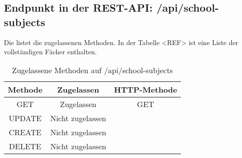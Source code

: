 \subsection{Endpunkt in der REST-API: /api/school-subjects}
\label{sec:end:rest:api:school-subjects}
Die  listet die zugelassenen Methoden. 
In der Tabelle <REF> ist eine Liste der vollständigen Fächer enthalten.


\begin{table}[!htbp]
	\begin{tabular}{|c|c|c|}
		\hline
			\textbf{Methode} & \textbf{Zugelassen} & \textbf{HTTP-Methode} \\ \hline
			GET & Zugelassen & GET \\ \hline
			UPDATE & Nicht zugelassen & \\ \hline 
			CREATE & Nicht zugelassen & \\ \hline 
			DELETE & Nicht zugelassen & \\ \hline
	\end{tabular}

		\caption{Zugelassene Methoden auf /api/school-subjects}
		\label{tab:end:rest:api:school-subjects:meth}
\end{table}





